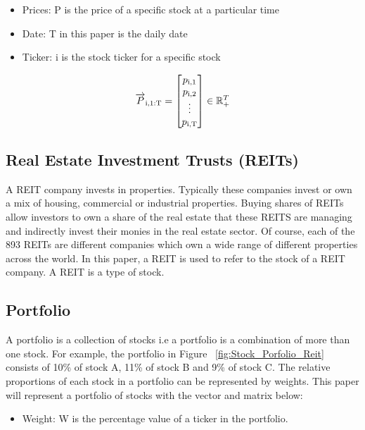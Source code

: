 \documentclass[a4paper,12pt]{report}
\numberwithin{equation}{section}
\theoremstyle{definition}
\begin{document}
\begin{itemize}

  \item {Prices: P is the price of a specific stock at a particular time}
  \item {Date: T in this paper is the daily date}
  \item {Ticker: i is the stock ticker for a specific stock}
  
\end{itemize}
\begin{equation*}
  \overrightarrow{P}\textsubscript{i,1:T} =  
  \begin{bmatrix}
    p\textsubscript{i,1} \\
    p\textsubscript{i,2} \\
    \vdots \\
    p\textsubscript{i,T} \\
  \end{bmatrix}
  \in \mathbb{R}_+^{T}
\end{equation*}

\subsection{Real Estate Investment Trusts (REITs)}
A REIT company invests in properties. Typically these companies invest or own a mix of housing, commercial or industrial properties. Buying shares of REITs allow investors to own a share of the real estate that these REITS are managing and indirectly invest their monies in the real estate sector. Of course, each of the 893 REITs are different companies which own a wide range of different properties across the world. In this paper, a REIT is used to refer to the stock of a REIT company. A REIT is a type of stock.

\subsection{Portfolio}
A portfolio is a collection of stocks i.e a portfolio is a combination of more than one stock. For example, the portfolio in Figure ~\ref{fig:Stock_Porfolio_Reit} consists of 10\% of stock A, 11\% of stock B and 9\% of stock C. The relative proportions of each stock in a portfolio can be represented by weights. This paper will represent a portfolio of stocks with the vector and matrix below:
\begin{itemize}

  \item {Weight: W is the percentage value of a ticker in the portfolio.}
  
\end{itemize}
\end{document}

